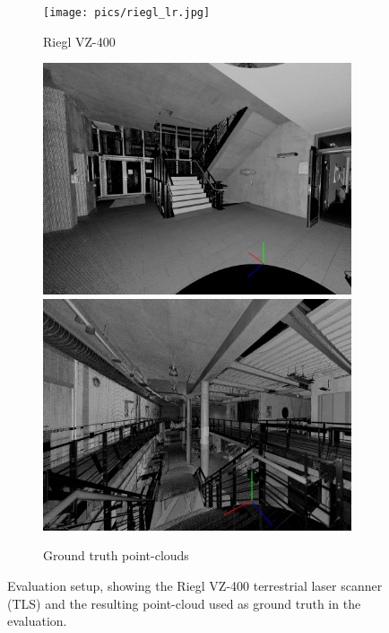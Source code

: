 \documentclass[a4paper, conference]{IEEEtran}
\begin{document}
\begin{figure}[t]
\centering
\begin{subfigure}{0.495\columnwidth}
        \centering
        \texttt{[image: pics/riegl\_lr.jpg]}
        \caption{Riegl VZ-400}
        \label{fig:riegl}
\end{subfigure}
\hfill
\begin{subfigure}{0.49\columnwidth}
        \centering
        \includegraphics[width=\textwidth]{pics/groundtruth1.png}\vspace{.5mm}
        \includegraphics[width=\textwidth]{pics/groundtruth2.png}
        \caption{Ground truth point-clouds}
        \label{fig:sphere_on_the_move}
\end{subfigure}
\caption{Evaluation setup, showing the Riegl VZ-400 terrestrial laser scanner (TLS) and the resulting point-cloud used as ground truth in the evaluation.}\vspace{-3mm}
\end{figure}
\end{document}
